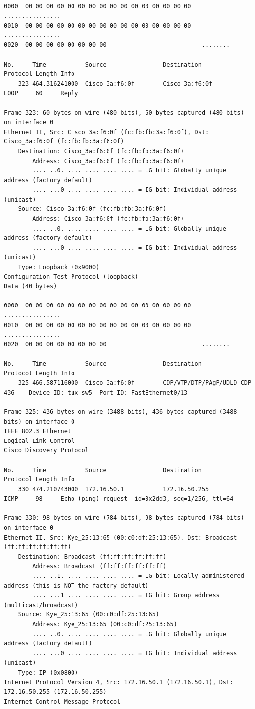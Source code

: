 \documentclass[a4paper,11pt]{article}
\begin{document}
\begin{lstlisting}
0000  00 00 00 00 00 00 00 00 00 00 00 00 00 00 00 00   ................
0010  00 00 00 00 00 00 00 00 00 00 00 00 00 00 00 00   ................
0020  00 00 00 00 00 00 00 00                           ........

No.     Time           Source                Destination           Protocol Length Info
    323 464.316241000  Cisco_3a:f6:0f        Cisco_3a:f6:0f        LOOP     60     Reply

Frame 323: 60 bytes on wire (480 bits), 60 bytes captured (480 bits) on interface 0
Ethernet II, Src: Cisco_3a:f6:0f (fc:fb:fb:3a:f6:0f), Dst: Cisco_3a:f6:0f (fc:fb:fb:3a:f6:0f)
    Destination: Cisco_3a:f6:0f (fc:fb:fb:3a:f6:0f)
        Address: Cisco_3a:f6:0f (fc:fb:fb:3a:f6:0f)
        .... ..0. .... .... .... .... = LG bit: Globally unique address (factory default)
        .... ...0 .... .... .... .... = IG bit: Individual address (unicast)
    Source: Cisco_3a:f6:0f (fc:fb:fb:3a:f6:0f)
        Address: Cisco_3a:f6:0f (fc:fb:fb:3a:f6:0f)
        .... ..0. .... .... .... .... = LG bit: Globally unique address (factory default)
        .... ...0 .... .... .... .... = IG bit: Individual address (unicast)
    Type: Loopback (0x9000)
Configuration Test Protocol (loopback)
Data (40 bytes)

0000  00 00 00 00 00 00 00 00 00 00 00 00 00 00 00 00   ................
0010  00 00 00 00 00 00 00 00 00 00 00 00 00 00 00 00   ................
0020  00 00 00 00 00 00 00 00                           ........

No.     Time           Source                Destination           Protocol Length Info
    325 466.587116000  Cisco_3a:f6:0f        CDP/VTP/DTP/PAgP/UDLD CDP      436    Device ID: tux-sw5  Port ID: FastEthernet0/13  

Frame 325: 436 bytes on wire (3488 bits), 436 bytes captured (3488 bits) on interface 0
IEEE 802.3 Ethernet 
Logical-Link Control
Cisco Discovery Protocol

No.     Time           Source                Destination           Protocol Length Info
    330 474.210743000  172.16.50.1           172.16.50.255         ICMP     98     Echo (ping) request  id=0x2dd3, seq=1/256, ttl=64

Frame 330: 98 bytes on wire (784 bits), 98 bytes captured (784 bits) on interface 0
Ethernet II, Src: Kye_25:13:65 (00:c0:df:25:13:65), Dst: Broadcast (ff:ff:ff:ff:ff:ff)
    Destination: Broadcast (ff:ff:ff:ff:ff:ff)
        Address: Broadcast (ff:ff:ff:ff:ff:ff)
        .... ..1. .... .... .... .... = LG bit: Locally administered address (this is NOT the factory default)
        .... ...1 .... .... .... .... = IG bit: Group address (multicast/broadcast)
    Source: Kye_25:13:65 (00:c0:df:25:13:65)
        Address: Kye_25:13:65 (00:c0:df:25:13:65)
        .... ..0. .... .... .... .... = LG bit: Globally unique address (factory default)
        .... ...0 .... .... .... .... = IG bit: Individual address (unicast)
    Type: IP (0x0800)
Internet Protocol Version 4, Src: 172.16.50.1 (172.16.50.1), Dst: 172.16.50.255 (172.16.50.255)
Internet Control Message Protocol


\end{lstlisting}
\end{document}
